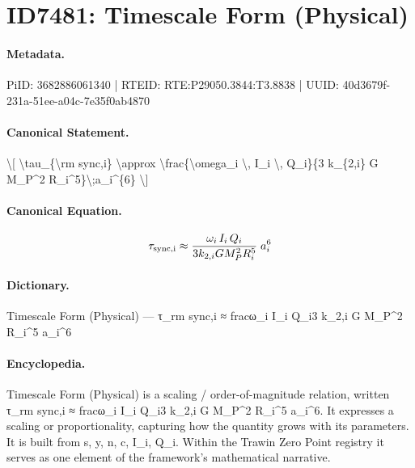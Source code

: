 \section*{ID7481: Timescale Form (Physical)}
\paragraph{Metadata.}
PiID: 3682886061340 | RTEID: RTE:P29050.3844:T3.8838 | UUID: 40d3679f-231a-51ee-a04c-7e35f0ab4870

\paragraph{Canonical Statement.}
\textbackslash{}[ \textbackslash{}tau\_\{\textbackslash{}rm sync,i\} \textbackslash{}approx \textbackslash{}frac\{\textbackslash{}omega\_i \textbackslash{}, I\_i \textbackslash{}, Q\_i\}\{3 k\_\{2,i\} G M\_P\textasciicircum{}2 R\_i\textasciicircum{}5\}\textbackslash{};a\_i\textasciicircum{}\{6\} \textbackslash{}]

\paragraph{Canonical Equation.}
\[
\tau_{\rm sync,i} \approx \frac{\omega_i \, I_i \, Q_i}{3 k_{2,i} G M_P^2 R_i^5}\;a_i^{6}
\]

\paragraph{Dictionary.}
Timescale Form (Physical) — τ\_rm sync,i ≈ fracω\_i I\_i Q\_i3 k\_2,i G M\_P\textasciicircum{}2 R\_i\textasciicircum{}5 a\_i\textasciicircum{}6

\paragraph{Encyclopedia.}
Timescale Form (Physical) is a scaling / order-of-magnitude relation, written τ\_rm sync,i ≈ fracω\_i I\_i Q\_i3 k\_2,i G M\_P\textasciicircum{}2 R\_i\textasciicircum{}5 a\_i\textasciicircum{}6. It expresses a scaling or proportionality, capturing how the quantity grows with its parameters. It is built from s, y, n, c, I\_i, Q\_i. Within the Trawin Zero Point registry it serves as one element of the framework's mathematical narrative.
